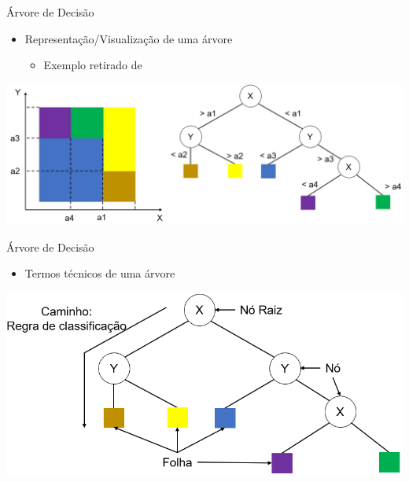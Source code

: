 \documentclass{libs/ufc_format}
\begin{document}
\begin{frame}{Árvore de Decisão}
    \begin{itemize}
        \item Representação/Visualização de uma árvore
            \begin{itemize}
                \item Exemplo retirado de \cite{l12}
            \end{itemize}
    \end{itemize}
    \includegraphics[width=\textwidth]{media/arvore_visual}
\end{frame}

\begin{frame}{Árvore de Decisão}
    \begin{itemize}
        \item Termos técnicos de uma árvore
    \end{itemize}
    \includegraphics[width=\textwidth]{media/arvore_termos}
\end{frame}
\end{document}
